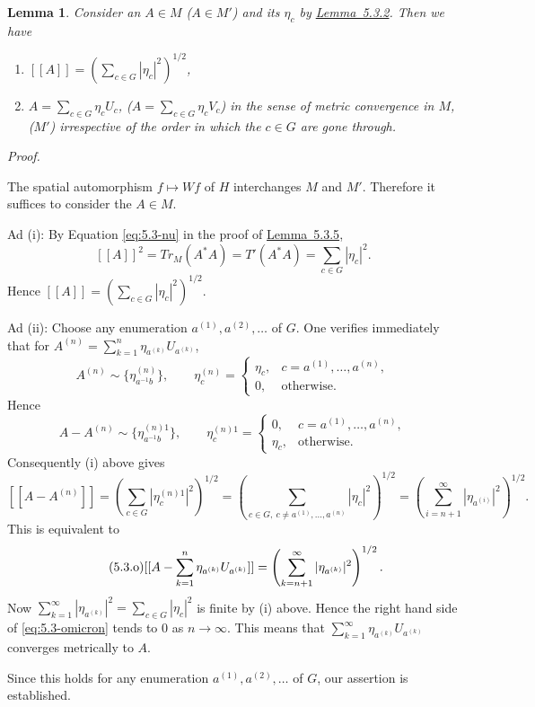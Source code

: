 \documentclass[b5paper,twoside]{article}
\newcommand{\lemref}[2]{\hyperref[#1]{\mbox{Lemma~#2}}}
\theoremstyle{mvnplain}
\newtheorem{lemma}{Lemma}[section]
\renewenvironment{proof}[1][Proof]{%
  \par\addvspace{0.35\baselineskip}%
  \noindent\textit{#1.}\ \normalfont\ignorespaces
}{%
  \par\addvspace{0.35\baselineskip}%
}
\newcommand{\M}{\mathbf M}
\newcommand{\Hilbert}{\mathfrak H}
\newcommand{\Metric}[1]{\left[\!\left[#1\right]\!\right]}
\def\M{M}%
\def\Hilbert{H}%
\def\Metric#1{[[#1]]}%
\def\operatorname#1{#1}%
\def\mathfrak#1{#1}%
\begin{document}
\begin{lemma}\label{lem:5.3.6}
Consider an \(A\in\M\) (\(A\in\M'\)) and its \(\eta_c\) by
\lemref{lem:5.3.2}{5.3.2}. Then we have
\begin{enumerate}[label=(\roman*)]
\item \(\displaystyle\Metric{A}=
\left(\sum_{c\in\mathfrak G}|\eta_c|^2\right)^{1/2}\),
\item \(\displaystyle A=\sum_{c\in\mathfrak G}\eta_cU_c\),
(\(\displaystyle A=\sum_{c\in\mathfrak G}\eta_cV_c\))
in the sense of metric convergence in \(\M\), (\(\M'\)) irrespective of the
order in which the \(c\in\mathfrak G\) are gone through.
\end{enumerate}
\end{lemma}

\begin{proof}
The spatial automorphism \(f\mapsto Wf\) of \(\Hilbert\) interchanges
\(\M\) and \(\M'\). Therefore it suffices to consider the \(A\in\M\).

Ad (i): By Equation \eqref{eq:5.3-nu} in the proof of
\lemref{lem:5.3.5}{5.3.5},
\[
 \Metric{A}^2=\operatorname{Tr}_{\M}(A^*A)=T'(A^*A)
 =\sum_{c\in\mathfrak G}|\eta_c|^2.
\]
Hence \(\Metric{A}=(\sum_{c\in\mathfrak G}|\eta_c|^2)^{1/2}\).

Ad (ii): Choose any enumeration \(a^{(1)},a^{(2)},\ldots\) of
\(\mathfrak G\). One verifies immediately that for
\(A^{(n)}=\sum_{k=1}^{n}\eta_{a^{(k)}}U_{a^{(k)}}\),
\[
 A^{(n)}\sim\{\eta^{(n)}_{a^{-1}b}\},\qquad
 \eta_c^{(n)}=\begin{cases}
 \eta_c,&c=a^{(1)},\ldots,a^{(n)},\\
 0,&\text{otherwise}.
 \end{cases}
\]
Hence
\[
 A-A^{(n)}\sim\{\eta^{(n)1}_{a^{-1}b}\},\qquad
 \eta_c^{(n)1}=\begin{cases}
 0,&c=a^{(1)},\ldots,a^{(n)},\\
 \eta_c,&\text{otherwise}.
 \end{cases}
\]
Consequently (i) above gives
\[
 \Metric{A-A^{(n)}}
 =\left(\sum_{c\in\mathfrak G}|\eta_c^{(n)1}|^2\right)^{1/2}
 =\left(\sum_{c\in\mathfrak G,\ c\ne a^{(1)},\ldots,a^{(n)}}
 |\eta_c|^2\right)^{1/2}
 =\left(\sum_{i=n+1}^{\infty}|\eta_{a^{(i)}}|^2\right)^{1/2}.
\]
This is equivalent to
\begin{equation}\tag{5.3.\(\mathrm{o}\)}\label{eq:5.3-omicron}
 \Metric{A-\sum_{k=1}^{n}\eta_{a^{(k)}}U_{a^{(k)}}}
 =\left(\sum_{k=n+1}^{\infty}|\eta_{a^{(k)}}|^2\right)^{1/2}.
\end{equation}
Now \(\sum_{k=1}^{\infty}|\eta_{a^{(k)}}|^2
=\sum_{c\in\mathfrak G}|\eta_c|^2\) is finite by (i) above. Hence the
right hand side of \eqref{eq:5.3-omicron} tends to 0 as \(n\to\infty\). This
means that \(\sum_{k=1}^{\infty}\eta_{a^{(k)}}U_{a^{(k)}}\) converges
metrically to \(A\).

Since this holds for any enumeration \(a^{(1)},a^{(2)},\ldots\) of
\(\mathfrak G\), our assertion is established.
\end{proof}
\end{document}
